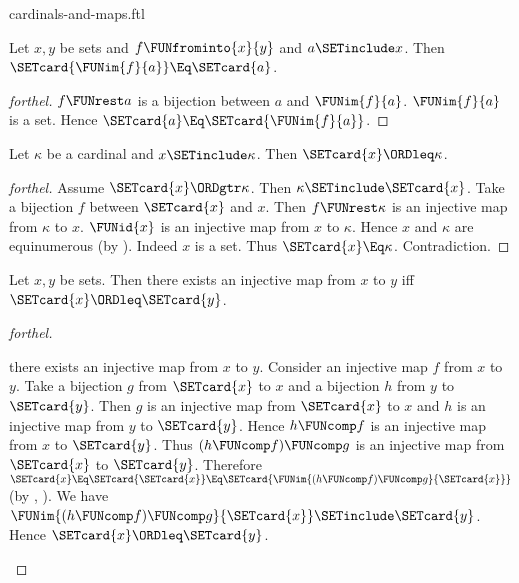 \documentclass{stex}
\begin{document}
\begin{smodule}{cardinals-and-maps.ftl}


\begin{proposition}[forthel,name=cardinality of image under injection]
  Let $x, y$ be sets and $f \FUNfrominto{x}{y}$ and $a \SETinclude x$.
  Then $\SETcard{\FUNim{f}{a}} \Eq \SETcard{a}$.
\end{proposition}
\begin{proof}[forthel]
  $f \FUNrest a$ is a bijection between $a$ and $\FUNim{f}{a}$.
  $\FUNim{f}{a}$ is a set.
  Hence $\SETcard{a} \Eq \SETcard{\FUNim{f}{a}}$.
\end{proof}

\begin{proposition}[forthel]
  Let $\kappa$ be a cardinal and $x \SETinclude \kappa$.
  Then $\SETcard{x} \ORDleq \kappa$.
\end{proposition}
\begin{proof}[forthel]
  Assume $\SETcard{x} \ORDgtr \kappa$.
  Then $\kappa \SETinclude \SETcard{x}$.
  Take a bijection $f$ between $\SETcard{x}$ and $x$.
  Then $f \FUNrest \kappa$ is an injective map from $\kappa$ to $x$.
  $\FUNid{x}$ is an injective map from $x$ to $\kappa$.
  Hence $x$ and $\kappa$ are equinumerous (by ).
  Indeed $x$ is a set.
  Thus $\SETcard{x} \Eq \kappa$.
  Contradiction.
\end{proof}


\begin{proposition}[forthel,name=existence condition for injections]
  Let $x, y$ be sets.
  Then there exists an injective map from $x$ to $y$ iff $\SETcard{x} \ORDleq \SETcard{y}$.
\end{proposition}
\begin{proof}[forthel]
  \begin{case}{there exists an injective map from $x$ to $y$.}
    Consider an injective map $f$ from $x$ to $y$.
    Take a bijection $g$ from $\SETcard{x}$ to $x$ and a bijection $h$ from $y$ to $\SETcard{y}$.
    Then $g$ is an injective map from $\SETcard{x}$ to $x$ and $h$ is an injective map from $y$ to $\SETcard{y}$.
    Hence $h \FUNcomp f$ is an injective map from $x$ to $\SETcard{y}$.
    Thus $(h \FUNcomp f) \FUNcomp g$ is an injective map from $\SETcard{x}$ to $\SETcard{y}$.
    Therefore $\SETcard{x}
      \Eq \SETcard{\SETcard{x}}
      \Eq \SETcard{\FUNim{(h \FUNcomp f) \FUNcomp g}{\SETcard{x}}}$
    (by , ).
    We have $\FUNim{(h \FUNcomp f) \FUNcomp g}{\SETcard{x}} \SETinclude \SETcard{y}$.
    Hence $\SETcard{x} \ORDleq \SETcard{y}$.
  \end{case}


\end{proof}
\end{smodule}
\end{document}

